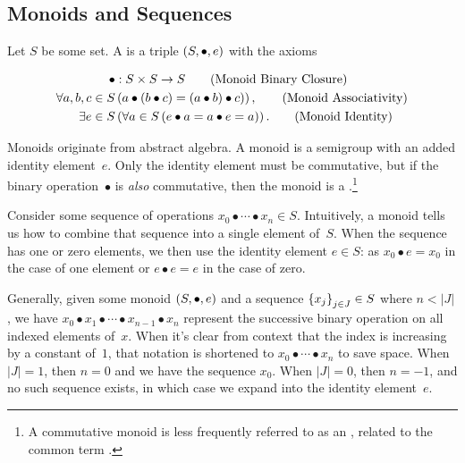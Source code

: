 \subsection{Monoids and Sequences}
\begin{definition}[Monoid]
  Let $S$ be some set.  A  is a triple $\left({S},{\bullet},{e}\right)$
    with the axioms

  \begin{align}
    \bullet &: S\times S \rightarrow S
      \tag{Monoid Binary Closure} \\
    \Forall{a,b,c\in S&}{a\bullet(b\bullet c) = (a\bullet b)\bullet c)},
      \tag{Monoid Associativity} \\
    \Exists{e\in S&}{\Forall{a\in S}{e\bullet a = a\bullet e = a}}.
      \tag{Monoid Identity}\label{eq:monoid-identity}
  \end{align}
\end{definition}

Monoids originate from abstract algebra.
A monoid is a semigroup with an added identity element~$e$.
Only the identity element must be commutative,
  but if the binary operation~$\bullet$ is \emph{also} commutative,
    then the monoid is a .\footnote{%
      A commutative monoid is less frequently referred to as an
        ,
          related to the common term .}

Consider some sequence of operations
  $x_0 \bullet\cdots\bullet x_n \in S$.
Intuitively,
  a monoid tells us how to combine that sequence into a single element
  of~$S$.
When the sequence has one or zero elements,
  we then use the identity element $e\in S$:
    as $x_0 \bullet e = x_0$ in the case of one element
    or $e \bullet e = e$ in the case of zero.

\indexsym{}
\begin{definition}
Generally,
  given some monoid $\left({S},{\bullet},{e}\right)$ and a sequence $\left\{x_{j}\right\}_{j\in J}\in S$
  where $n<|J|$,
    we have
    $x_0\bullet x_1\bullet\cdots\bullet x_{n-1}\bullet x_n$
    represent the successive binary operation on all indexed elements
    of~$x$.
When it's clear from context that the index is increasing by a constant
  of~$1$,
    that notation is shortened to $x_0\bullet\cdots\bullet x_n$ to save
    space.
When $|J|=1$, then $n=0$ and we have the sequence $x_0$.
When $|J|=0$, then $n=-1$,
  and no such sequence exists,
  in which case we expand into the identity element~$e$.
\end{definition}

